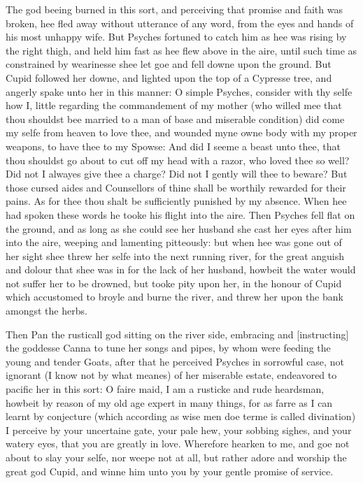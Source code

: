 The god beeing burned in this sort, and perceiving that promise and faith was
broken, hee fled away without utterance of any word, from the eyes and hands of
his most unhappy wife. But Psyches fortuned to catch him as hee was rising by
the right thigh, and held him fast as hee flew above in the aire, until such
time as constrained by wearinesse shee let goe and fell downe upon the ground.
But Cupid followed her downe, and lighted upon the top of a Cypresse tree, and
angerly spake unto her in this manner: O simple Psyches, consider with thy
selfe how I, little regarding the commandement of my mother (who willed mee
that thou shouldst bee married to a man of base and miserable condition) did
come my selfe from heaven to love thee, and wounded myne owne body with my
proper weapons, to have thee to my Spowse: And did I seeme a beast unto thee,
that thou shouldst go about to cut off my head with a razor, who loved thee so
well? Did not I alwayes give thee a charge? Did not I gently will thee to
beware? But those cursed aides and Counsellors of thine shall be worthily
rewarded for their pains. As for thee thou shalt be sufficiently punished by my
absence. When hee had spoken these words he tooke his flight into the aire.
Then Psyches fell flat on the ground, and as long as she could see her husband
she cast her eyes after him into the aire, weeping and lamenting pitteously:
but when hee was gone out of her sight shee threw her selfe into the next
running river, for the great anguish and dolour that shee was in for the lack
of her husband, howbeit the water would not suffer her to be drowned, but tooke
pity upon her, in the honour of Cupid which accustomed to broyle and burne the
river, and threw her upon the bank amongst the herbs.

Then Pan the rusticall god sitting on the river side, embracing and
[instructing] the goddesse Canna to tune her songs and pipes, by whom were
feeding the young and tender Goats, after that he perceived Psyches in
sorrowful case, not ignorant (I know not by what meanes) of her miserable
estate, endeavored to pacific her in this sort: O faire maid, I am a rusticke
and rude heardsman, howbeit by reason of my old age expert in many things, for
as farre as I can learnt by conjecture (which according as wise men doe terme
is called divination) I perceive by your uncertaine gate, your pale hew, your
sobbing sighes, and your watery eyes, that you are greatly in love. Wherefore
hearken to me, and goe not about to slay your selfe, nor weepe not at all, but
rather adore and worship the great god Cupid, and winne him unto you by your
gentle promise of service.

